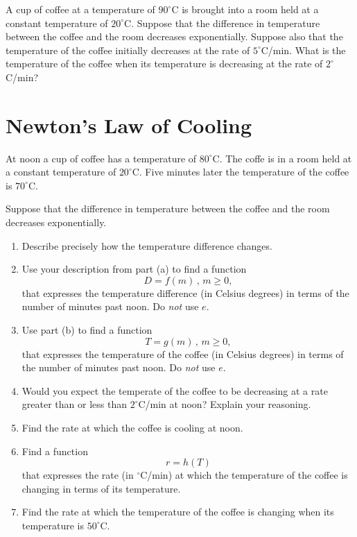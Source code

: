 \documentclass{ximera}
\begin{document}
\begin{question} \label{QPKdkefERF}
A cup of coffee at a temperature of $90^\circ$C is brought into a room held at a constant temperature of $20^\circ$C. Suppose that the difference in temperature between the coffee and the room decreases exponentially. Suppose also that the temperature of the coffee initially decreases at the rate of $5^\circ$C/min. What is the temperature of the coffee when its temperature is decreasing at the rate of $2^\circ$C/min?
\end{question}

\section{Newton's Law of Cooling}

\begin{question} \label{Qpvem33}
At noon a cup of coffee has a temperature of $80^\circ$C. The coffe is in a room held at a constant temperature of $20^\circ$C. Five minutes later the temperature of the coffee is $70^\circ$C.

Suppose that the difference in temperature between the coffee and the room decreases exponentially.

\begin{enumerate}
\item Describe precisely how the temperature difference changes.

\item Use your description from part (a) to find a function
\[
     D = f(m) \, , \, m \geq 0,
\]
that expresses the temperature difference (in Celsius degrees) in terms of the number of minutes past noon. Do \emph{not} use $e$.

\item Use part (b) to find a function
\[
  T = g(m) \, , \, m\geq 0,
\]
that expresses the temperature of the coffee (in Celsius degrees) in terms of the number of minutes past noon. Do \emph{not} use $e$.

\item Would you expect the temperate of the coffee to be decreasing at a rate greater than or less than $2^\circ$C/min at noon? Explain your reasoning.

\item Find the rate at which the coffee is cooling at noon.

\item Find a function
\[
  r = h(T) 
\]
that expresses the rate (in $^\circ$C/min) at which the temperature of the coffee is changing in terms of its temperature.

\item Find the rate at which the temperature of the coffee is changing when its temperature is $50^\circ$C.

\end{enumerate}
  
\end{question}
\end{document}

